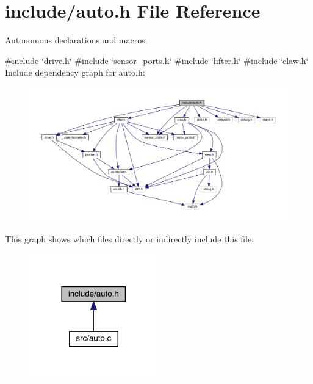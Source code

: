 \section{include/auto.h File Reference}
\label{auto_8h}


Autonomous declarations and macros.  


{\ttfamily \#include \char`\"{}drive.\+h\char`\"{}}\newline
{\ttfamily \#include \char`\"{}sensor\+\_\+ports.\+h\char`\"{}}\newline
{\ttfamily \#include \char`\"{}lifter.\+h\char`\"{}}\newline
{\ttfamily \#include \char`\"{}claw.\+h\char`\"{}}\newline
Include dependency graph for auto.\+h\+:
\nopagebreak
\begin{figure}[H]
\begin{center}
\leavevmode
\includegraphics[width=350pt]{auto_8h__incl}
\end{center}
\end{figure}
This graph shows which files directly or indirectly include this file\+:
\nopagebreak
\begin{figure}[H]
\begin{center}
\leavevmode
\includegraphics[width=158pt]{auto_8h__dep__incl}
\end{center}
\end{figure}
